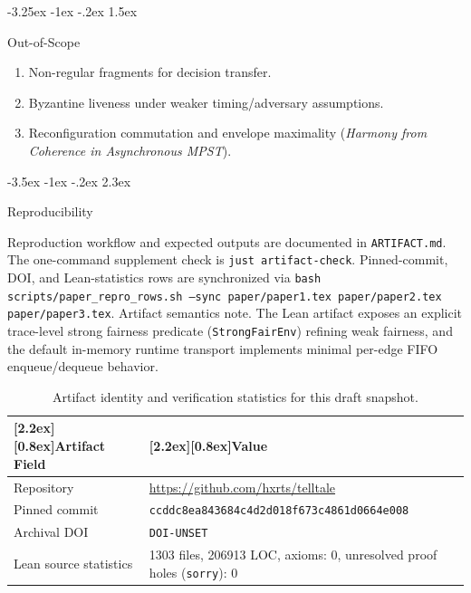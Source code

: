 \documentclass[a4paper,10pt,twocolumn,english]{article}
\makeatletter
\renewcommand{\section}{\@startsection{section}{1}{\z@}%
  {-3.5ex \@plus -1ex \@minus -.2ex}%
  {2.3ex}%
  {\raggedright\normalfont\large\bfseries}}
\renewcommand{\subsection}{\@startsection{subsection}{2}{\z@}%
  {-3.25ex \@plus -1ex \@minus -.2ex}%
  {1.5ex}%
  {\raggedright\normalfont\normalsize\bfseries}}
\numberwithin{equation}{section}
\theoremstyle{paperdef}
\theoremstyle{paperplain}
\theoremstyle{paperdef}
\theoremstyle{paperremark}
\newcommand{\thead}[1]{\textbf{\raisebox{0pt}[2.2ex][0.8ex]{#1}}}
\makeatother
\begin{document}
\subsection{Out-of-Scope}

\begin{enumerate}
	\item Non-regular fragments for decision transfer.
	\item Byzantine liveness under weaker timing/adversary assumptions.
	\item Reconfiguration commutation and envelope maximality (\emph{Harmony from Coherence in Asynchronous MPST}).
\end{enumerate}

\section{Reproducibility}
\label{app:reproducibility}

Reproduction workflow and expected outputs are documented in
\texttt{ARTIFACT.md}. The one-command supplement check is
\texttt{just artifact-check}. Pinned-commit, DOI, and Lean-statistics rows are
synchronized via
\texttt{bash scripts/paper\_repro\_rows.sh --sync paper/paper1.tex paper/paper2.tex paper/paper3.tex}.
Artifact semantics note. The Lean artifact exposes an explicit trace-level
strong fairness predicate (\texttt{StrongFairEnv}) refining weak fairness, and
the default in-memory runtime transport implements minimal per-edge FIFO
enqueue/dequeue behavior.

\begin{table}[H]
	\centering
	\footnotesize
	\begin{tabularx}{\columnwidth}{@{}L{0.34\columnwidth}L{0.61\columnwidth}@{}}
		\toprule
		\thead{Artifact Field} & \thead{Value}                                                                             \\
		\midrule
		Repository             & \url{https://github.com/hxrts/telltale}                                                   \\
		Pinned commit & \texttt{ccddc8ea843684c4}\allowbreak\texttt{d2d018f673c4861d}\allowbreak\texttt{0664e008} \\
		Archival DOI & \texttt{DOI-UNSET} \\
		Lean source statistics & 1303 files, 206913 LOC, axioms: 0, unresolved proof holes (\texttt{sorry}): 0 \\
		\bottomrule
	\end{tabularx}
	\caption{Artifact identity and verification statistics for this draft snapshot.}
\end{table}
\end{document}
